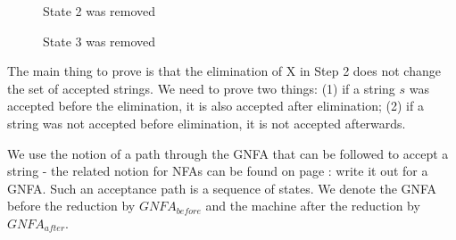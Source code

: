 \begin{figure}[h]
\caption{State 2 was removed \label{gfsa2}}
\end{figure}

\begin{figure}[h]
\caption{State 3 was removed \label{gfsa3}}
\end{figure}


The main thing to prove is that the elimination of X in
Step 2 does not change the set of accepted strings. We need to prove
two things: (1) if a string $s$ was accepted before the elimination,
it is also accepted after elimination; (2) if a string was not accepted
before elimination, it is not accepted afterwards.


We use the notion of a path through the GNFA that can be followed to
accept a string - the related notion for NFAs can be found on page
\pageref{defacceptnfa}: write it out for a GNFA. Such an acceptance
path is a sequence of states. We denote the GNFA before the reduction
by $GNFA_{before}$ and the machine after the reduction by
$GNFA_{after}$.


